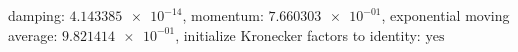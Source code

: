 damping: $\num[scientific-notation=true]{4.143385e-14}$, momentum: $\num[scientific-notation=true]{7.660303e-01}$, exponential moving average: $\num[scientific-notation=true]{9.821414e-01}$, initialize Kronecker factors to identity: $\text{yes}$